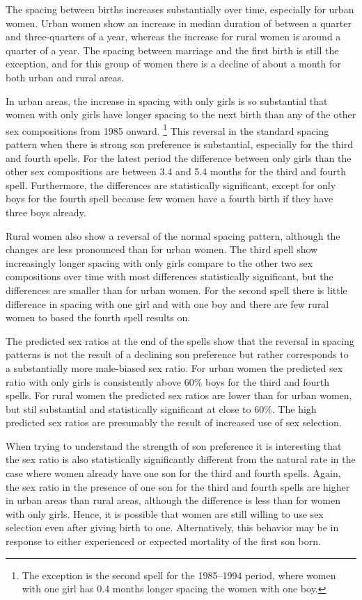 \documentclass[12pt,letterpaper]{article}
\begin{document}
The spacing between births increases substantially over time, especially
for urban women. 
Urban women show an increase in median duration of between a quarter
and three-quarters of a year, whereas the increase for rural women is 
around a quarter of a year.
The spacing between marriage and the first birth is still the
exception, and for this group of women there is a decline of
about a month for both urban and rural areas.

In urban areas, the increase in spacing with only girls is so 
substantial that women with only girls have longer spacing to the 
next birth than any of the other sex compositions from 1985 onward.%
\footnote{
The exception is the second spell for the 1985--1994 period, where women
with one girl has 0.4 months longer spacing the women with one boy.
}
This reversal in the standard spacing pattern when there is strong
son preference is substantial, especially for the third and fourth 
spells.
For the latest period the difference between only girls than the
other sex compositions are between 3.4 and 5.4 months for the third
and fourth spell.
Furthermore, the differences are statistically significant, except
for only boys for the fourth spell because few women have a fourth
birth if they have three boys already.

Rural women also show a reversal of the normal spacing pattern,
although the changes are less pronounced than for urban women.
The third spell show increasingly longer spacing with only
girls compare to the other two sex compositions over time with
most differences statistically significant, but the differences
are smaller than for urban women.
For the second spell there is little difference in spacing with
one girl and with one boy and there are few rural women to 
based the fourth spell results on.

The predicted sex ratios at the end of the spells show that
the reversal in spacing patterns is not the result of a declining son
preference but rather corresponds to a substantially more male-biased 
sex ratio.
For urban women the predicted sex ratio with only girls 
is consistently above 60\% boys for the third and fourth spells.
For rural women the predicted sex ratios are lower than for urban
women, but stil substantial and statistically significant at close 
to 60\%.
The high predicted sex ratios are presumably the result of increased 
use of sex selection.

When trying to understand the strength of son preference it is interesting
that the sex ratio is also statistically significantly different
from the natural rate in the case where women already have one
son for the third and fourth spells.
Again, the sex ratio in the presence of one son for the third and
fourth spells are higher in urban areas than rural areas, although
the difference is less than for women with only girls.
Hence, it is possible that women are still willing to use sex selection
even after giving birth to one. 
Alternatively, this behavior may be in response to either experienced
or expected mortality of the first son born.
\end{document}
